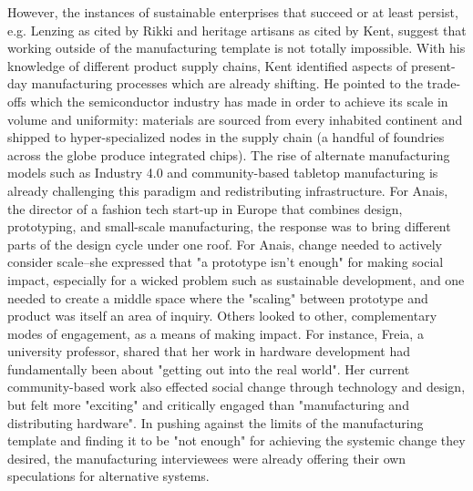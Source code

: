 \documentclass[manuscript,review,anonymous]{acmart}
\begin{document}
However, the instances of sustainable enterprises that succeed or at least persist, e.g. Lenzing as cited by Rikki and heritage artisans as cited by Kent, suggest that working outside of the manufacturing template is not totally impossible.
With his knowledge of different product supply chains, Kent identified aspects of present-day manufacturing processes which are already shifting. He pointed to the trade-offs which the semiconductor industry has made in order to achieve its scale in volume and uniformity: materials are sourced from every inhabited continent and shipped to hyper-specialized nodes in the supply chain (a handful of foundries across the globe produce integrated chips). The rise of alternate manufacturing models such as Industry 4.0 and community-based tabletop manufacturing \cite{machado_sustainable_2020, kohtala_making_2017} is already challenging this paradigm and redistributing infrastructure. For Anais, the director of a fashion tech start-up in Europe that combines design, prototyping, and small-scale manufacturing, the response was to bring different parts of the design cycle under one roof. For Anais, change needed to actively consider scale--she expressed that "a prototype isn't enough" for making social impact, especially for a wicked problem such as sustainable development, and one needed to create a middle space where the "scaling" between prototype and product was itself an area of inquiry. Others looked to other, complementary modes of engagement, as a means of making impact. For instance, Freia, a university professor, shared that her work in hardware development had fundamentally been about "getting out into the real world". Her current community-based work also effected social change through technology and design, but felt more "exciting" and critically engaged than "manufacturing and distributing hardware". In pushing against the limits of the manufacturing template and finding it to be "not enough" for achieving the systemic change they desired, the manufacturing interviewees were already offering their own speculations for alternative systems. 
\end{document}
